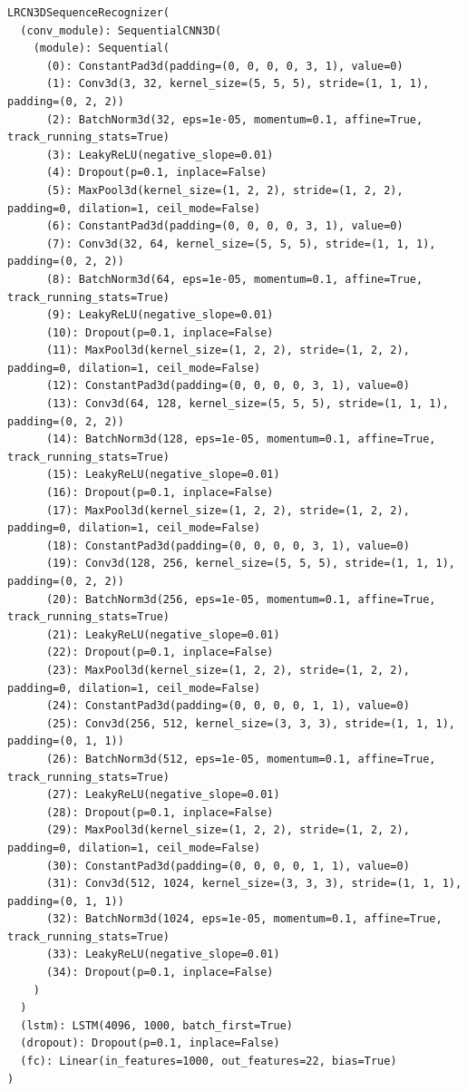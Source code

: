 \documentclass[10pt,twocolumn,letterpaper]{article}
\begin{document}
{
\footnotesize
\begin{verbatim}
LRCN3DSequenceRecognizer(
  (conv_module): SequentialCNN3D(
    (module): Sequential(
      (0): ConstantPad3d(padding=(0, 0, 0, 0, 3, 1), value=0)
      (1): Conv3d(3, 32, kernel_size=(5, 5, 5), stride=(1, 1, 1), padding=(0, 2, 2))
      (2): BatchNorm3d(32, eps=1e-05, momentum=0.1, affine=True, track_running_stats=True)
      (3): LeakyReLU(negative_slope=0.01)
      (4): Dropout(p=0.1, inplace=False)
      (5): MaxPool3d(kernel_size=(1, 2, 2), stride=(1, 2, 2), padding=0, dilation=1, ceil_mode=False)
      (6): ConstantPad3d(padding=(0, 0, 0, 0, 3, 1), value=0)
      (7): Conv3d(32, 64, kernel_size=(5, 5, 5), stride=(1, 1, 1), padding=(0, 2, 2))
      (8): BatchNorm3d(64, eps=1e-05, momentum=0.1, affine=True, track_running_stats=True)
      (9): LeakyReLU(negative_slope=0.01)
      (10): Dropout(p=0.1, inplace=False)
      (11): MaxPool3d(kernel_size=(1, 2, 2), stride=(1, 2, 2), padding=0, dilation=1, ceil_mode=False)
      (12): ConstantPad3d(padding=(0, 0, 0, 0, 3, 1), value=0)
      (13): Conv3d(64, 128, kernel_size=(5, 5, 5), stride=(1, 1, 1), padding=(0, 2, 2))
      (14): BatchNorm3d(128, eps=1e-05, momentum=0.1, affine=True, track_running_stats=True)
      (15): LeakyReLU(negative_slope=0.01)
      (16): Dropout(p=0.1, inplace=False)
      (17): MaxPool3d(kernel_size=(1, 2, 2), stride=(1, 2, 2), padding=0, dilation=1, ceil_mode=False)
      (18): ConstantPad3d(padding=(0, 0, 0, 0, 3, 1), value=0)
      (19): Conv3d(128, 256, kernel_size=(5, 5, 5), stride=(1, 1, 1), padding=(0, 2, 2))
      (20): BatchNorm3d(256, eps=1e-05, momentum=0.1, affine=True, track_running_stats=True)
      (21): LeakyReLU(negative_slope=0.01)
      (22): Dropout(p=0.1, inplace=False)
      (23): MaxPool3d(kernel_size=(1, 2, 2), stride=(1, 2, 2), padding=0, dilation=1, ceil_mode=False)
      (24): ConstantPad3d(padding=(0, 0, 0, 0, 1, 1), value=0)
      (25): Conv3d(256, 512, kernel_size=(3, 3, 3), stride=(1, 1, 1), padding=(0, 1, 1))
      (26): BatchNorm3d(512, eps=1e-05, momentum=0.1, affine=True, track_running_stats=True)
      (27): LeakyReLU(negative_slope=0.01)
      (28): Dropout(p=0.1, inplace=False)
      (29): MaxPool3d(kernel_size=(1, 2, 2), stride=(1, 2, 2), padding=0, dilation=1, ceil_mode=False)
      (30): ConstantPad3d(padding=(0, 0, 0, 0, 1, 1), value=0)
      (31): Conv3d(512, 1024, kernel_size=(3, 3, 3), stride=(1, 1, 1), padding=(0, 1, 1))
      (32): BatchNorm3d(1024, eps=1e-05, momentum=0.1, affine=True, track_running_stats=True)
      (33): LeakyReLU(negative_slope=0.01)
      (34): Dropout(p=0.1, inplace=False)
    )
  )
  (lstm): LSTM(4096, 1000, batch_first=True)
  (dropout): Dropout(p=0.1, inplace=False)
  (fc): Linear(in_features=1000, out_features=22, bias=True)
)
\end{verbatim}
}
\end{document}
